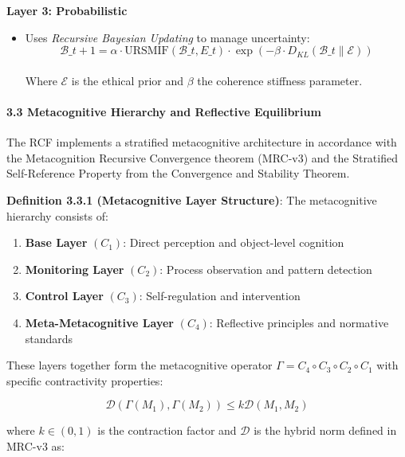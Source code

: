 \documentclass[12pt]{article}
\providecommand{\tightlist}{%
  \setlength{\itemsep}{0pt}\setlength{\parskip}{0pt}}
\begin{document}
\textbf{Layer 3: Probabilistic}

\begin{itemize}
\tightlist
\item
  Uses \emph{Recursive Bayesian Updating} to manage uncertainty:\\
  \[ \mathcal{B}\_{t+1} = \alpha \cdot \text{URSMIF}(\mathcal{B}\_t, E\_t) \cdot \exp(-\beta
  \cdot D_{KL}(\mathcal{B}\_t \parallel \mathcal{E})) \]\\
  Where $\mathcal{E}$ is the ethical prior and $\beta$ the coherence stiffness
  parameter.
\end{itemize}

\paragraph{\texorpdfstring{\textbf{3.3 Metacognitive Hierarchy and
Reflective
Equilibrium}}{3.3 Metacognitive Hierarchy and Reflective Equilibrium}}\label{metacognitive-hierarchy-and-reflective-equilibrium}

The RCF implements a stratified metacognitive architecture in accordance
with the Metacognition Recursive Convergence theorem (MRC-v3) and the
Stratified Self-Reference Property from the Convergence and Stability
Theorem.

\textbf{Definition 3.3.1 (Metacognitive Layer Structure)}: The
metacognitive hierarchy consists of:

\begin{enumerate}
\def\labelenumi{\arabic{enumi}.}
\tightlist
\item
  \textbf{Base Layer} \((C_1)\): Direct perception and object-level
  cognition
\item
  \textbf{Monitoring Layer} \((C_2)\): Process observation and pattern
  detection
\item
  \textbf{Control Layer} \((C_3)\): Self-regulation and intervention
\item
  \textbf{Meta-Metacognitive Layer} \((C_4)\): Reflective principles and
  normative standards
\end{enumerate}

These layers together form the metacognitive operator
\(\Gamma = C_4 \circ C_3 \circ C_2 \circ C_1\) with specific
contractivity properties:

\[\mathcal{D}(\Gamma(M_1), \Gamma(M_2)) \leq k \mathcal{D}(M_1, M_2)\]

where \(k \in (0,1)\) is the contraction factor and \(\mathcal{D}\) is
the hybrid norm defined in MRC-v3 as:
\end{document}

